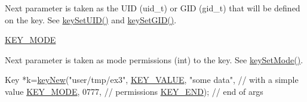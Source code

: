 \begin{DoxyRefList}
\begin{DoxyItemize}
 Next parameter is taken as the U\-I\-D (uid\-\_\-t) or G\-I\-D (gid\-\_\-t) that will be defined on the key. See \hyperlink{group__meta_gab5f284f5ecd261e0a290095f50ba1af7}{key\-Set\-U\-I\-D()} and \hyperlink{group__meta_ga9e3d0fb3f7ba906e067727b9155d22e3}{key\-Set\-G\-I\-D()}.
\item \hyperlink{group__key_gga91fb3178848bd682000958089abbaf40a1b0a91ff3a855d6993930ebf0abaa518}{K\-E\-Y\-\_\-\-M\-O\-D\-E} \par
 Next parameter is taken as mode permissions (int) to the key. See \hyperlink{group__meta_ga8803037e35b9da1ce492323a88ff6bc3}{key\-Set\-Mode()}. 
\begin{DoxyCodeInclude}
Key *k=\hyperlink{group__key_gad23c65b44bf48d773759e1f9a4d43b89}{keyNew}(\textcolor{stringliteral}{"user/tmp/ex3"},
        \hyperlink{group__key_gga91fb3178848bd682000958089abbaf40ac66e4a49d09212b79f5754ca6db5bd2e}{KEY\_VALUE}, \textcolor{stringliteral}{"some data"},    \textcolor{comment}{// with a simple value}
        \hyperlink{group__key_gga91fb3178848bd682000958089abbaf40a1b0a91ff3a855d6993930ebf0abaa518}{KEY\_MODE}, 0777,            \textcolor{comment}{// permissions}
        \hyperlink{group__key_gga91fb3178848bd682000958089abbaf40aa8adb6fcb92dec58fb19410eacfdd403}{KEY\_END});                  \textcolor{comment}{// end of args}
\end{DoxyCodeInclude}


\end{DoxyItemize}
\end{DoxyRefList}
